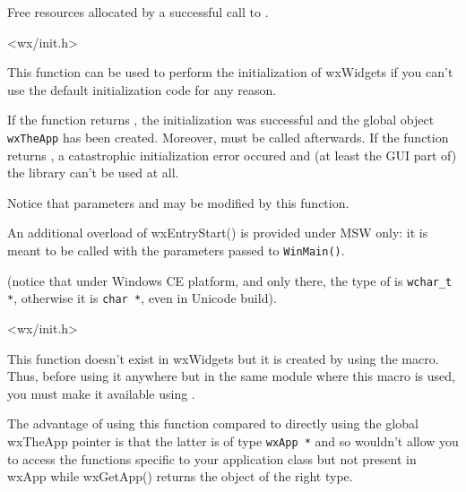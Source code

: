 
Free resources allocated by a successful call to .


<wx/init.h>


\label{wxentrystart}


This function can be used to perform the initialization of wxWidgets if you
can't use the default initialization code for any reason.

If the function returns \true, the initialization was successful and the global 
 object \texttt{wxTheApp} has been created. Moreover, 
 must be called afterwards. If the
function returns \false, a catastrophic initialization error occured and (at
least the GUI part of) the library can't be used at all.

Notice that parameters  and  may be modified by this
function.

An additional overload of wxEntryStart() is provided under MSW only: it is
meant to be called with the parameters passed to \texttt{WinMain()}.


(notice that under Windows CE platform, and only there, the type of 
 is \texttt{wchar\_t *}, otherwise it is \texttt{char *}, even in
Unicode build).


<wx/init.h>


\label{wxgetapp}


This function doesn't exist in wxWidgets but it is created by using
the  macro. Thus, before using it
anywhere but in the same module where this macro is used, you must make it
available using .

The advantage of using this function compared to directly using the global
wxTheApp pointer is that the latter is of type {\tt wxApp *} and so wouldn't
allow you to access the functions specific to your application class but not
present in wxApp while wxGetApp() returns the object of the right type.


